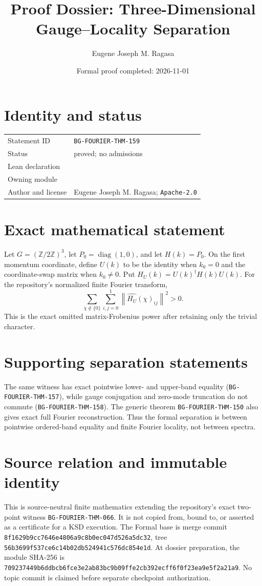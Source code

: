 \documentclass[10pt]{article}
\title{Proof Dossier: Three-Dimensional Gauge--Locality Separation}
\author{Eugene Joseph M. Ragasa}
\date{Formal proof completed: 2026-11-01}
\begin{document}
\raggedright
\maketitle

\section{Identity and status}
\begin{tabularx}{\textwidth}{@{}lY@{}}
\toprule
Statement ID & \texttt{BG-FOURIER-THM-159} \\
Status & proved; no admissions \\
Lean declaration &  \\
Owning module &  \\
Author and license & Eugene Joseph M. Ragasa; \texttt{Apache-2.0} \\
\bottomrule
\end{tabularx}

\section{Exact mathematical statement}
Let $G=(\mathbb Z/2\mathbb Z)^3$, let $P_0=\operatorname{diag}(1,0)$, and let
$H(k)=P_0$.  On the first momentum coordinate, define $U(k)$ to be the identity when
$k_0=0$ and the coordinate-swap matrix when $k_0\ne0$.  Put
$H_U(k)=U(k)^\dagger H(k)U(k)$.  For the repository's normalized finite Fourier transform,
\[
 \sum_{\chi\notin\{0\}}\sum_{i,j=0}^{1}
   \left\lVert\widehat{H_U}(\chi)_{ij}\right\rVert^2>0.
\]
This is the exact omitted matrix-Frobenius power after retaining only the trivial character.

\section{Supporting separation statements}
The same witness has exact pointwise lower- and upper-band equality
(\texttt{BG-FOURIER-THM-157}), while gauge conjugation and zero-mode truncation do not commute
(\texttt{BG-FOURIER-THM-158}).  The generic theorem
\texttt{BG-FOURIER-THM-150} also gives exact full Fourier reconstruction.  Thus the formal
separation is between pointwise ordered-band equality and finite Fourier locality, not between
spectra.

\section{Source relation and immutable identity}
This is source-neutral finite mathematics extending the repository's exact two-point witness
\texttt{BG-FOURIER-THM-066}.  It is not copied from, bound to, or asserted as a certificate for a
KSD execution.  The Formal base is merge commit
\texttt{8f1629b9cc7646e4806a9c8b0ec047d526a5dc32}, tree
\texttt{56b3699f537ce6c14b02db524941c576dc854e1d}.  At dossier preparation, the module SHA-256 is
\texttt{709237449b6ddbcb6fce3e2ab83bc9b09ffe2cb392ecff6f0f23ea9e5f2a21a9}.
No topic commit is claimed before separate checkpoint authorization.
\end{document}

